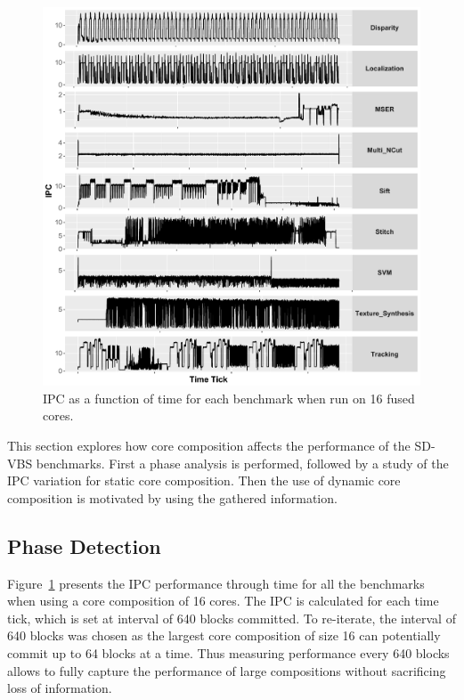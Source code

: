 
\begin{figure}[t]
    \centering
    \includegraphics[width=1\textwidth]{cases-paper/graphics/Exploration/ipcs_16_3.pdf}
    \caption{IPC as a function of time for each benchmark when run on 16 fused cores.}
    \label{fig:sxt}
	\vspace{2em}
\end{figure}

This section explores how core composition affects the performance of the SD-VBS benchmarks.
First a phase analysis is performed, followed by a study of the IPC variation for static core composition.
Then the use of dynamic core composition is motivated by using the gathered information.


\subsection{Phase Detection}
Figure~\ref{fig:sxt} presents the IPC performance through time for all the benchmarks when using a core composition of 16 cores.
The IPC is calculated for each time tick, which is set at interval of 640 blocks committed.
To re-iterate, the interval of 640 blocks was chosen as the largest core composition of size 16 can potentially commit up to 64 blocks at a time.
Thus measuring performance every 640 blocks allows to fully capture the performance of large compositions without sacrificing loss of information.

